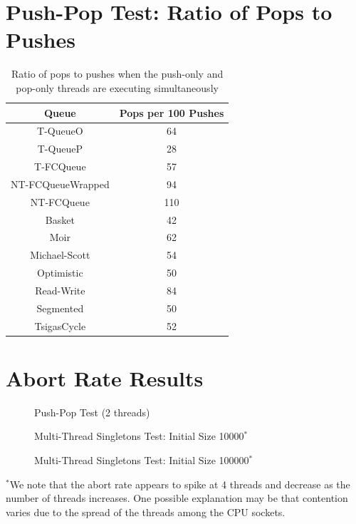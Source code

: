 \section{Push-Pop Test: Ratio of Pops to Pushes}

\begin{table}[H]
        \centering
    \begin{tabular}{|cc|}
        \hline
        Queue & Pops per 100 Pushes\\
        \hline
            T-QueueO & 64\\
            T-QueueP & 28\\
            T-FCQueue & 57\\
            NT-FCQueueWrapped & 94\\
            NT-FCQueue & 110\\
            Basket & 42\\
            Moir & 62\\
            Michael-Scott& 54\\
            Optimistic & 50\\
            Read-Write & 84\\
            Segmented & 50\\
            TsigasCycle & 52\\
        \hline
    \end{tabular}
    \caption*{Ratio of pops to pushes when the push-only and pop-only threads are executing simultaneously}
\end{table}


\section{Abort Rate Results}
\label{app:queue_mt}

\begin{table}[H]
\begin{figure}[H]
    \centering
    
    \caption*{Push-Pop Test (2 threads)}
\end{figure}
\begin{figure}[H]
    \centering
        
    \caption*{Multi-Thread Singletons Test: Initial Size 10000$^*$}
\end{figure}
\begin{figure}[H]
    \centering
    
    \caption*{Multi-Thread Singletons Test: Initial Size 100000$^*$}
\end{figure}
    \caption*{\footnotesize{$^*$We note that the abort rate appears to spike at 4 threads and decrease as the number of threads increases. One possible explanation may be that contention varies due to the spread of the threads among the CPU sockets.}}
\end{table}
